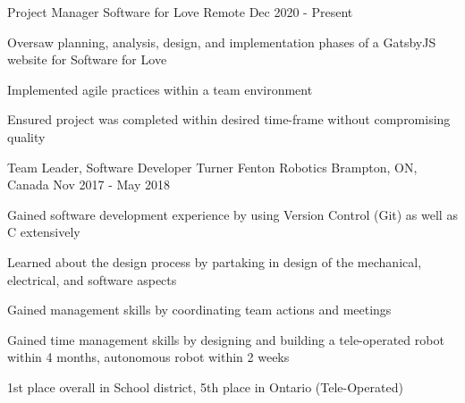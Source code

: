 
\begin{cventries}

   \cventry
    {Project Manager} %
    {Software for Love} %
    {Remote} %
    {Dec 2020 - Present} %
    {
      \begin{cvitems} %
      \item Oversaw planning, analysis, design, and implementation phases of a GatsbyJS website for Software for Love
      \item Implemented agile practices within a team environment
      \item Ensured project was completed within desired time-frame without compromising quality
      \end{cvitems}
    }

  \cventry
    {Team Leader, Software Developer} %
    {Turner Fenton Robotics} %
    {Brampton, ON, Canada} %
    {Nov 2017 - May 2018} %
    {
      \begin{cvitems} %
      \item Gained software development experience by using Version Control (Git) as well as C extensively 
      \item Learned about the design process by partaking in design of the mechanical, electrical, and software aspects 
      \item Gained management skills by coordinating team actions and meetings \item Gained time management skills by designing and building a tele-operated robot within 4 months, autonomous robot within 2 weeks 
      \item 1st place overall in School district, 5th place in Ontario (Tele-Operated)
      \end{cvitems}
    }


\end{cventries}


